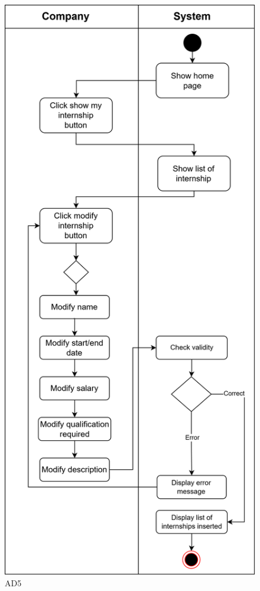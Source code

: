 \begin{figure}[H]
    \centering
    \includegraphics[width=0.6\linewidth]{Images/UseCasesDiagrams-UC modify-internship.png}
    \caption{AD5}
    \label{AD5}
\end{figure}

